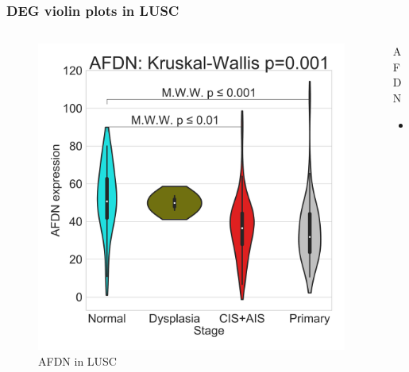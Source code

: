 \documentclass{beamer}
\begin{document}
                \begin{frame}[allowframebreaks]
                    \frametitle{DEG violin plots in LUSC}

                    \begin{columns}
                        \begin{column}{0.4 \textwidth}
                            \begin{figure}
                                \includegraphics[width=\linewidth]{figures/DEG/Violin/STAR.TPM.SQC.violin/AFDN.pdf}
                                \caption{AFDN in LUSC}
                            \end{figure}
                        \end{column}
                        \begin{column}{0.55 \textwidth}
                            \begin{block}{AFDN}
                                \begin{itemize}
                                    \item
                                \end{itemize}
                            \end{block}
                        \end{column}
                    \end{columns}
                \end{frame}
\end{document}
